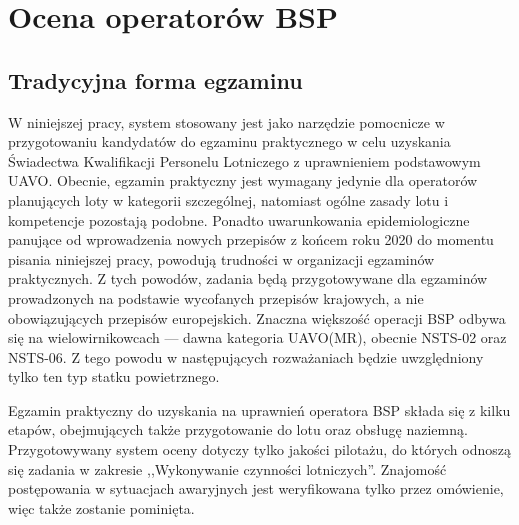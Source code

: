 \newpage
\section{Ocena operatorów BSP}

\subsection{Tradycyjna forma egzaminu}
\label{sec:tradycyjny-egzamin}
W niniejszej pracy, system stosowany jest jako narzędzie pomocnicze w przygotowaniu kandydatów do egzaminu praktycznego w celu uzyskania Świadectwa Kwalifikacji Personelu Lotniczego z uprawnieniem podstawowym UAVO. Obecnie, egzamin praktyczny jest wymagany jedynie dla operatorów planujących loty w kategorii szczególnej\cite{ulc2019}, natomiast ogólne zasady lotu i kompetencje pozostają podobne. Ponadto uwarunkowania epidemiologiczne panujące od wprowadzenia nowych przepisów z końcem roku 2020 do momentu pisania niniejszej pracy, powodują trudności w organizacji egzaminów praktycznych. Z tych powodów, zadania będą przygotowywane dla egzaminów prowadzonych na podstawie wycofanych przepisów krajowych, a nie obowiązujących przepisów europejskich. Znaczna większość operacji BSP odbywa się na wielowirnikowcach --- dawna kategoria UAVO(MR), obecnie NSTS-02 oraz NSTS-06. Z tego powodu w następujących rozważaniach będzie uwzględniony tylko ten typ statku powietrznego.

Egzamin praktyczny do uzyskania na uprawnień operatora BSP składa się z kilku etapów, obejmujących także przygotowanie do lotu oraz obsługę naziemną\cite{ulc2014}. Przygotowywany system oceny dotyczy tylko jakości pilotażu, do których odnoszą się zadania w zakresie ,,Wykonywanie czynności lotniczych''. Znajomość postępowania w sytuacjach awaryjnych jest weryfikowana tylko przez omówienie, więc także zostanie pominięta.

